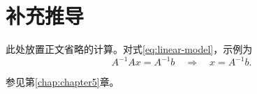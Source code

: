 \chapter{补充推导}
\label{app:derivation}

此处放置正文省略的计算。对式\eqref{eq:linear-model}，示例为
\begin{equation}
  A^{-1}Ax=A^{-1}b
  \quad\Longrightarrow\quad x=A^{-1}b.
  \label{eq:appendix-derivation}
\end{equation}

参见第\ref{chap:chapter5}章。
